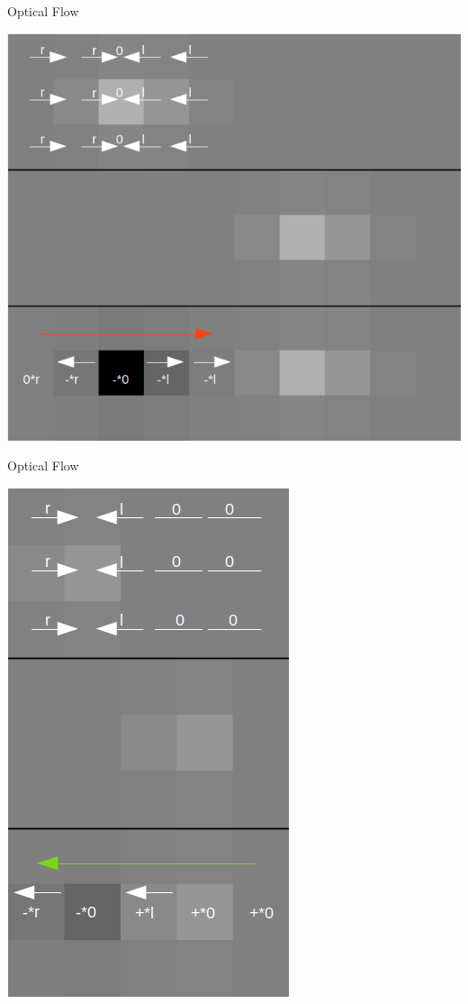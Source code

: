 \documentclass[aspectratio=169]{beamer}
\begin{document}
\begin{frame}{Optical Flow}
  \begin{center}
    \includegraphics[height=0.9\textheight]{../img/optical_flow_intuitive_2.png}
  \end{center}
\end{frame}

\begin{frame}{Optical Flow}
  \begin{center}
    \includegraphics[height=0.9\textheight]{../img/optical_flow_intuitive_3.png}
  \end{center}
\end{frame}
\end{document}
